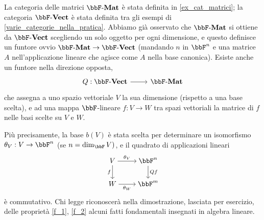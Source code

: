 \begin{example}\label{ex_grafi_refl}
\end{example}
\begin{example}
	La categoria delle matrici \(\ctMat\) è stata definita in \ref{ex_cat_matrici}; la categoria \(\ctVect\) è stata definita tra gli esempi di \ref{varie_categorie_nella_pratica}. Abbiamo già osservato che \(\ctMat\) si ottiene da \(\ctVect\) scegliendo un solo oggetto per ogni dimensione, e questo definisce un funtore ovvio \(\ctMat \to \ctVect\) (mandando \(n\) in \(\bbF^n\) e una matrice \(A\) nell'applicazione lineare che agisce come \(A\) nella base canonica). Esiste anche un funtore nella direzione opposta,
	\[\dmFun{Q}{\ctVect}{\ctMat}\]
	che assegna a uno spazio vettoriale \(V\) la sua dimensione (rispetto a una base scelta), e ad una mappa \(\bbF\)-lineare \(f : V\to W\) tra spazi vettoriali la matrice di \(f\) nelle basi scelte su \(V\) e \(W\).

	Più precisamente, la base \(b(V)\) è stata scelta per determinare un isomorfismo \(\theta_V : V \to \bbF^n\) (se \(n=\dim_\bbF V)\), e il quadrato di applicazioni lineari
	\[\begin{tikzcd}[cramped]
			V & {\bbF^n} \\
			W & {\bbF^m}
			\arrow["{\theta_V}", from=1-1, to=1-2]
			\arrow["f"', from=1-1, to=2-1]
			\arrow["Qf", from=1-2, to=2-2]
			\arrow["{\theta_W}"', from=2-1, to=2-2]
		\end{tikzcd}\]
	è commutativo. Chi legge riconoscerà nella dimostrazione, lasciata per esercizio, delle proprietà \ref{f_1}, \ref{f_2} alcuni fatti fondamentali insegnati in algebra lineare.
\end{example}
